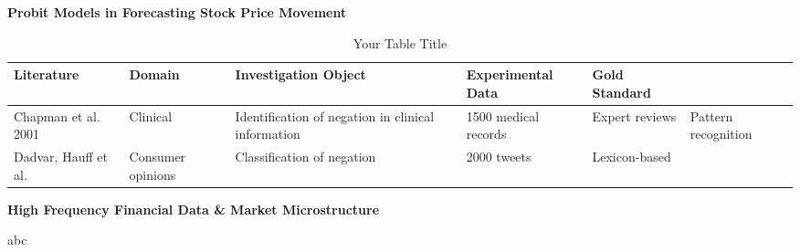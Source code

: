 \par
{\noindent\bfseries Probit Models in Forecasting Stock Price Movement}

\begin{landscape}
\begin{table}[htbp]
    \centering
    \caption{Your Table Title}
    \label{tab:my-table}
    \begin{tabularx}{\linewidth}{l X l X l}
        \hline
        \textbf{Literature} & \textbf{Domain} & \textbf{Investigation Object} &
        \textbf{Experimental Data} & \textbf{Gold Standard} \\
        \hline
        Chapman et al. 2001 & Clinical & Identification of negation in clinical information &
        1500 medical records & Expert reviews & Pattern recognition \\
        Dadvar, Hauff et al. & Consumer opinions & Classification of negation &
        2000 tweets & Lexicon-based \\
        \hline
    \end{tabularx}
\end{table}
\end{landscape}

\par

{\noindent\bfseries High Frequency Financial Data \& Market Microstructure}

abc